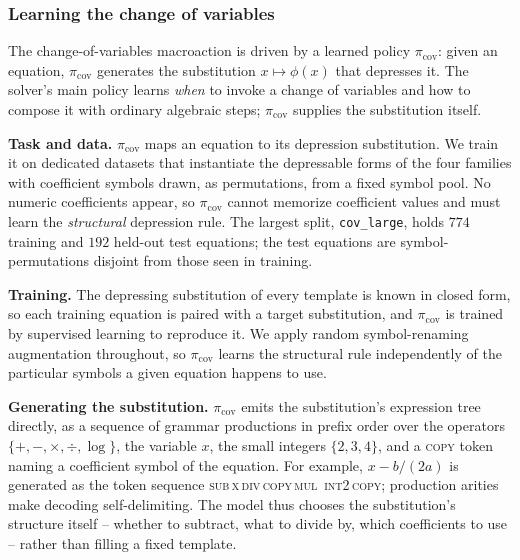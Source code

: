 \subsubsection{Learning the change of variables}
\label{sec:picov}

The change-of-variables macroaction is driven by a learned policy
$\pi_{\mathrm{cov}}$: given an equation, $\pi_{\mathrm{cov}}$ generates the
substitution $x \mapsto \phi(x)$ that depresses it. The solver's main policy
learns \emph{when} to invoke a change of variables and how to compose it with
ordinary algebraic steps; $\pi_{\mathrm{cov}}$ supplies the substitution
itself.

\textbf{Task and data.}
$\pi_{\mathrm{cov}}$ maps an equation to its depression substitution. We train
it on dedicated datasets that instantiate the depressable forms of the four
families with coefficient symbols drawn, as permutations, from a fixed symbol
pool. No numeric coefficients appear, so $\pi_{\mathrm{cov}}$ cannot memorize
coefficient values and must learn the \emph{structural} depression rule. The
largest split, \texttt{cov\_large}, holds $774$ training and $192$ held-out
test equations; the test equations are symbol-permutations disjoint from
those seen in training.

\textbf{Training.}
The depressing substitution of every template is known in closed form, so
each training equation is paired with a target substitution, and
$\pi_{\mathrm{cov}}$ is trained by supervised learning to reproduce it. We
apply random symbol-renaming augmentation throughout, so $\pi_{\mathrm{cov}}$
learns the structural rule independently of the particular symbols a given
equation happens to use.

\textbf{Generating the substitution.}
$\pi_{\mathrm{cov}}$ emits the substitution's expression tree directly, as a
sequence of grammar productions in prefix order over the operators
$\{+,-,\times,\div,\log\}$, the variable $x$, the small integers
$\{2,3,4\}$, and a \textsc{copy} token naming a coefficient symbol of the
equation. For example, $x - b/(2a)$ is generated as the token sequence
\textsc{sub}\,\textsc{x}\,\textsc{div}\,\textsc{copy}\,\textsc{mul}\,%
\textsc{int2}\,\textsc{copy}; production arities make decoding
self-delimiting. The model thus chooses the substitution's structure itself
-- whether to subtract, what to divide by, which coefficients to use --
rather than filling a fixed template.

